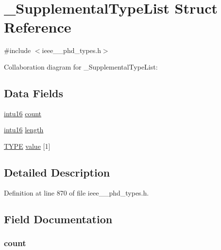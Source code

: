\hypertarget{struct___supplemental_type_list}{}\section{\+\_\+\+Supplemental\+Type\+List Struct Reference}
\label{struct___supplemental_type_list}


{\ttfamily \#include $<$ieee\+\_\+\_\+phd\+\_\+types.\+h$>$}



Collaboration diagram for \+\_\+\+Supplemental\+Type\+List\+:
\subsection*{Data Fields}
\begin{DoxyCompactItemize}
\item 
\hyperlink{ieee__11073__phd__types_8h_a3561595d2aa7416532e1c9910abd076d}{intu16} \hyperlink{struct___supplemental_type_list_abf6db060ae8e224764b0f867fb135ecd}{count}
\item 
\hyperlink{ieee__11073__phd__types_8h_a3561595d2aa7416532e1c9910abd076d}{intu16} \hyperlink{struct___supplemental_type_list_a3743679e4ff85e3e1b3fc2e59973fbb3}{length}
\item 
\hyperlink{ieee__11073__phd__types_8h_a56278ab9208915aa619527c8d826835a}{T\+Y\+P\+E} \hyperlink{struct___supplemental_type_list_aca3607d9103cdb241f17f92581108e4e}{value} \mbox{[}1\mbox{]}
\end{DoxyCompactItemize}


\subsection{Detailed Description}


Definition at line 870 of file ieee\+\_\+\_\+phd\+\_\+types.\+h.



\subsection{Field Documentation}
\hypertarget{struct___supplemental_type_list_abf6db060ae8e224764b0f867fb135ecd}{}
\subsubsection[{count}]{ count}\label{struct___supplemental_type_list_abf6db060ae8e224764b0f867fb135ecd}


